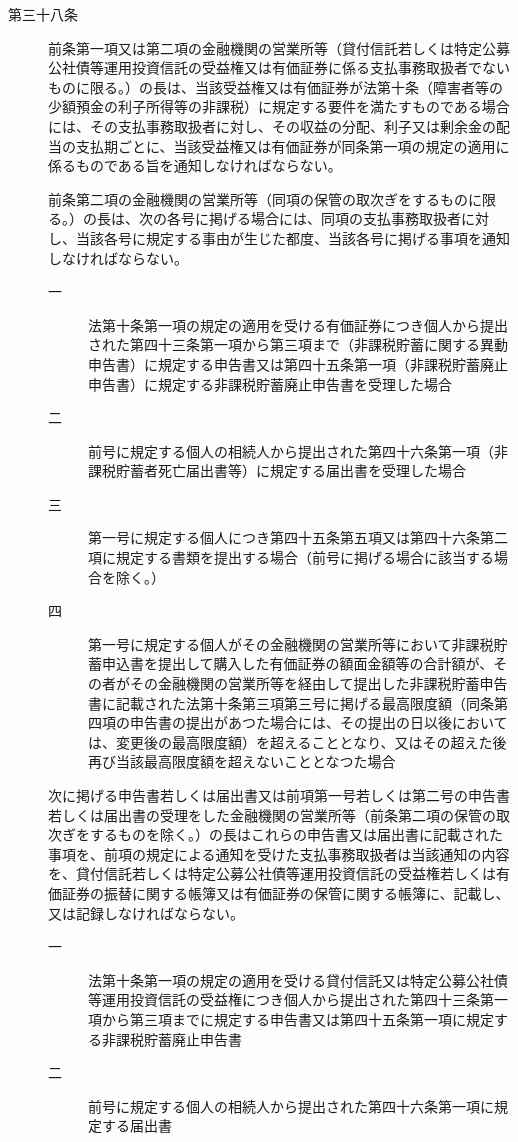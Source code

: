 \documentclass[twocolumn,a4j,10pt]{ltjtarticle}
\begin{document}
\begin{description}
\item[第三十八条]前条第一項又は第二項の金融機関の営業所等（貸付信託若しくは特定公募公社債等運用投資信託の受益権又は有価証券に係る支払事務取扱者でないものに限る。）の長は、当該受益権又は有価証券が法第十条（障害者等の少額預金の利子所得等の非課税）に規定する要件を満たすものである場合には、その支払事務取扱者に対し、その収益の分配、利子又は剰余金の配当の支払期ごとに、当該受益権又は有価証券が同条第一項の規定の適用に係るものである旨を通知しなければならない。
\item[]前条第二項の金融機関の営業所等（同項の保管の取次ぎをするものに限る。）の長は、次の各号に掲げる場合には、同項の支払事務取扱者に対し、当該各号に規定する事由が生じた都度、当該各号に掲げる事項を通知しなければならない。
\begin{description}
\item[一]法第十条第一項の規定の適用を受ける有価証券につき個人から提出された第四十三条第一項から第三項まで（非課税貯蓄に関する異動申告書）に規定する申告書又は第四十五条第一項（非課税貯蓄廃止申告書）に規定する非課税貯蓄廃止申告書を受理した場合
\item[二]前号に規定する個人の相続人から提出された第四十六条第一項（非課税貯蓄者死亡届出書等）に規定する届出書を受理した場合
\item[三]第一号に規定する個人につき第四十五条第五項又は第四十六条第二項に規定する書類を提出する場合（前号に掲げる場合に該当する場合を除く。）
\item[四]第一号に規定する個人がその金融機関の営業所等において非課税貯蓄申込書を提出して購入した有価証券の額面金額等の合計額が、その者がその金融機関の営業所等を経由して提出した非課税貯蓄申告書に記載された法第十条第三項第三号に掲げる最高限度額（同条第四項の申告書の提出があつた場合には、その提出の日以後においては、変更後の最高限度額）を超えることとなり、又はその超えた後再び当該最高限度額を超えないこととなつた場合
\end{description}
\item[]次に掲げる申告書若しくは届出書又は前項第一号若しくは第二号の申告書若しくは届出書の受理をした金融機関の営業所等（前条第二項の保管の取次ぎをするものを除く。）の長はこれらの申告書又は届出書に記載された事項を、前項の規定による通知を受けた支払事務取扱者は当該通知の内容を、貸付信託若しくは特定公募公社債等運用投資信託の受益権若しくは有価証券の振替に関する帳簿又は有価証券の保管に関する帳簿に、記載し、又は記録しなければならない。
\begin{description}
\item[一]法第十条第一項の規定の適用を受ける貸付信託又は特定公募公社債等運用投資信託の受益権につき個人から提出された第四十三条第一項から第三項までに規定する申告書又は第四十五条第一項に規定する非課税貯蓄廃止申告書
\item[二]前号に規定する個人の相続人から提出された第四十六条第一項に規定する届出書
\end{description}
\end{description}
\end{document}

